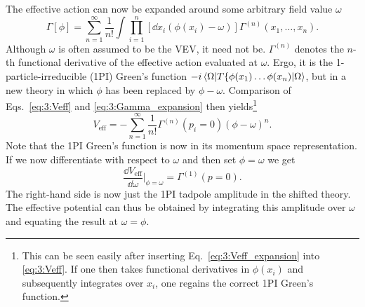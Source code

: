 The effective action can now be expanded around some arbitrary field value $\omega$
\begin{equation}
\Gamma [\phi] = \sum_{n = 1}^\infty \frac{1}{n!} \int \prod_{i = 1}^{n} \left[\dd x_i \left(\phi (x_i) - \omega \right) \right] \Gamma^{(n)}(x_1, \ldots, x_n).
\label{eq:3:Gamma_expansion}
\end{equation}
Although $\omega$ is often assumed to be the \acs{VEV}, it need not be. $\Gamma^{(n)}$ denotes the $n$-th functional derivative of the effective action evaluated at $\omega$. Ergo, it is the 1-particle-irreducible (\acs{1PI}) Green's function $-i\braket{\Omega |T \lbrace \phi(x_1) \dots \phi (x_n)|\Omega}$, but in a new theory in which $\phi$ has been replaced by $\phi - \omega$. Comparison of Eqs.~\eqref{eq:3:Veff} and \eqref{eq:3:Gamma_expansion} then yields\footnote{This can be seen easily after inserting Eq.~\eqref{eq:3:Veff_expansion} into \eqref{eq:3:Veff}. If one then takes functional derivatives in $\phi(x_i)$ and subsequently integrates over $x_i$, one regains the correct \acs{1PI} Green's function.}
\begin{equation}
V_\text{eff} = - \sum_{n = 1}^\infty \frac{1}{n!} \Gamma^{(n)} (p_i = 0) \left( \phi - \omega \right)^n.
\label{eq:3:Veff_expansion}
\end{equation}
Note that the \acs{1PI} Green's function is now in its momentum space representation. If we now differentiate with respect to $\omega$ and then set $\phi = \omega$ we get
\begin{equation}
\frac{\dd V_{\text{eff}}}{\dd \omega} \bigg \vert_{\phi = \omega} =  \Gamma^{(1)} (p = 0).
\label{eq:3:Veff_diff}
\end{equation}
The right-hand side is now just the \acs{1PI} tadpole amplitude in the shifted theory. The effective potential can thus be obtained by integrating this amplitude over $\omega$ and equating the result at $\omega = \phi$.

